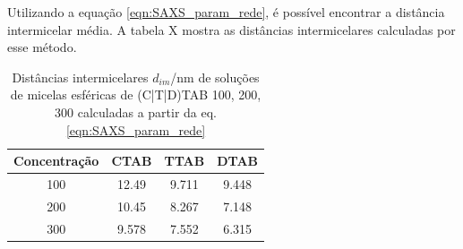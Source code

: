 	Utilizando a equação \ref{eqn:SAXS_param_rede}, é possível encontrar a distância intermicelar média. A tabela X mostra as distâncias intermicelares calculadas por esse método.
	
	
		\begin{table}
		\IBGEtab%
		{\caption{Distâncias intermicelares $d_{im}$/nm de soluções de micelas esféricas de (C|T|D)TAB 100, 200, 300 \mM{} calculadas a partir da eq. \ref{eqn:SAXS_param_rede}}
			\label{tab:SAXS_dim}}%
		{\begin{tabular}{c c c c}
			\toprule
			Concentração  &	CTAB	& TTAB & 	DTAB  \\
			\midrule
			100 &	12.49	& 9.711	& 9.448   \\
			200 &	10.45	& 8.267& 	7.148   \\
			300	& 9.578	& 7.552& 	6.315   \\
			\bottomrule
		\end{tabular}}%
		{}
	\end{table}  %
	
